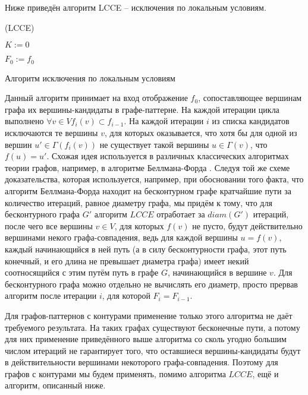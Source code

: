 Ниже приведён алгоритм LCCE -- исключения по локальным условиям.
\begin{algorithm}[H]
	\Large
	\Begin(LCCE){
		$K := 0$
		
		$F_0 := f_0$
		
	}

	\caption{Алгоритм исключения по локальным условиям}
	\label{alg:LCCE}
\end{algorithm}

Данный алгоритм принимает на вход отображение $f_0$, сопоставляющее вершинам графа их вершины-кандидаты в графе-паттерне. На каждой итерации цикла выполнено $\forall v \in V f_{i}(v) \subset f_{i-1}$. На каждой итерации $i$ из списка кандидатов исключаются те вершины $v$, для которых оказывается, что хотя бы для одной из вершин $u' \in \Gamma(f_i(v))$ не существует такой вершины $u \in \Gamma(v)$, что $f(u) = u'$. Схожая идея используется в различных классических алгоритмах теории графов, например, в алгоритме Беллмана-Форда \cite{bellmanford}. Следуя той же схеме доказательства, которая используется, например, при обосновании того факта, что алгоритм Беллмана-Форда находит на бесконтурном графе кратчайшие пути за количество итераций, равное диаметру графа, мы придём к тому, что для бесконтурного графа $G'$ алгоритм $LCCE$ отработает за $diam(G')$ итераций, после чего все вершины $v \in V$, для которых $f(v)$ не пусто, будут действительно вершинами некого графа-совпадения, ведь для каждой вершины $u = f(v)$, каждый начинающийся в ней путь (а в силу бесконтурности графа, этот путь конечный, и его длина не превышает диаметра графа) имеет некий соотносящийся с этим путём путь в графе $G$, начинающийся в вершине $v$. Для бесконтурного графа можно отдельно не вычислять его диаметр, просто прервав алгоритм после итерации $i$, для которой $F_i = F_{i-1}$.

Для графов-паттернов с контурами применение только этого алгоритма не даёт требуемого результата. На таких графах существуют бесконечные пути, а потому для них применение приведённого выше алгоритма со сколь угодно большим числом итераций не гарантирует того, что оставшиеся вершины-кандидаты будут в действительности вершинами некоторого графа-совпадения. Поэтому для графов с контурами мы будем применять, помимо алгоритма $LCCE$, ещё и алгоритм, описанный ниже.


